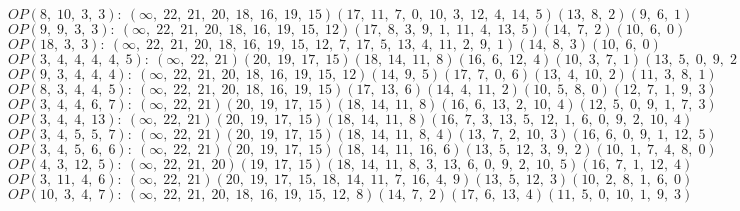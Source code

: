 $OP(8, \;10, \;3, \;3): \:(\infty, \;22, \;21, \;20, \;18, \;16, \;19, \;15)(17, \;11, \;7, \;0, \;10, \;3, \;12, \;4, \;14, \;5)(13, \;8, \;2)(9, \;6, \;1)$\\
$OP(9, \;9, \;3, \;3): \:(\infty, \;22, \;21, \;20, \;18, \;16, \;19, \;15, \;12)(17, \;8, \;3, \;9, \;1, \;11, \;4, \;13, \;5)(14, \;7, \;2)(10, \;6, \;0)$\\
$OP(18, \;3, \;3): \:(\infty, \;22, \;21, \;20, \;18, \;16, \;19, \;15, \;12, \;7, \;17, \;5, \;13, \;4, \;11, \;2, \;9, \;1)(14, \;8, \;3)(10, \;6, \;0)$\\
$OP(3, \;4, \;4, \;4, \;4, \;5): \:(\infty, \;22, \;21)(20, \;19, \;17, \;15)(18, \;14, \;11, \;8)(16, \;6, \;12, \;4)(10, \;3, \;7, \;1)(13, \;5, \;0, \;9, \;2)$\\
$OP(9, \;3, \;4, \;4, \;4): \:(\infty, \;22, \;21, \;20, \;18, \;16, \;19, \;15, \;12)(14, \;9, \;5)(17, \;7, \;0, \;6)(13, \;4, \;10, \;2)(11, \;3, \;8, \;1)$\\
$OP(8, \;3, \;4, \;4, \;5): \:(\infty, \;22, \;21, \;20, \;18, \;16, \;19, \;15)(17, \;13, \;6)(14, \;4, \;11, \;2)(10, \;5, \;8, \;0)(12, \;7, \;1, \;9, \;3)$\\
$OP(3, \;4, \;4, \;6, \;7): \:(\infty, \;22, \;21)(20, \;19, \;17, \;15)(18, \;14, \;11, \;8)(16, \;6, \;13, \;2, \;10, \;4)(12, \;5, \;0, \;9, \;1, \;7, \;3)$\\
$OP(3, \;4, \;4, \;13): \:(\infty, \;22, \;21)(20, \;19, \;17, \;15)(18, \;14, \;11, \;8)(16, \;7, \;3, \;13, \;5, \;12, \;1, \;6, \;0, \;9, \;2, \;10, \;4)$\\
$OP(3, \;4, \;5, \;5, \;7): \:(\infty, \;22, \;21)(20, \;19, \;17, \;15)(18, \;14, \;11, \;8, \;4)(13, \;7, \;2, \;10, \;3)(16, \;6, \;0, \;9, \;1, \;12, \;5)$\\
$OP(3, \;4, \;5, \;6, \;6): \:(\infty, \;22, \;21)(20, \;19, \;17, \;15)(18, \;14, \;11, \;16, \;6)(13, \;5, \;12, \;3, \;9, \;2)(10, \;1, \;7, \;4, \;8, \;0)$\\
$OP(4, \;3, \;12, \;5): \:(\infty, \;22, \;21, \;20)(19, \;17, \;15)(18, \;14, \;11, \;8, \;3, \;13, \;6, \;0, \;9, \;2, \;10, \;5)(16, \;7, \;1, \;12, \;4)$\\
$OP(3, \;11, \;4, \;6): \:(\infty, \;22, \;21)(20, \;19, \;17, \;15, \;18, \;14, \;11, \;7, \;16, \;4, \;9)(13, \;5, \;12, \;3)(10, \;2, \;8, \;1, \;6, \;0)$\\
$OP(10, \;3, \;4, \;7): \:(\infty, \;22, \;21, \;20, \;18, \;16, \;19, \;15, \;12, \;8)(14, \;7, \;2)(17, \;6, \;13, \;4)(11, \;5, \;0, \;10, \;1, \;9, \;3)$\\
